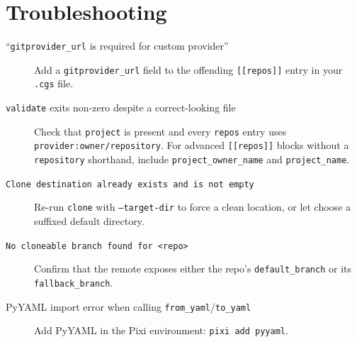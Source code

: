 \section{Troubleshooting}

\begin{description}
  \item[``\texttt{gitprovider\_url} is required for custom provider'']
    Add a \texttt{gitprovider\_url} field to the offending
    \texttt{[[repos]]} entry in your \texttt{.cgs} file.
  \item[\texttt{validate} exits non-zero despite a correct-looking file]
    Check that \texttt{project} is present and every \texttt{repos} entry uses
    \texttt{provider:owner/repository}. For advanced \texttt{[[repos]]}
    blocks without a \texttt{repository} shorthand, include
    \texttt{project\_owner\_name} and \texttt{project\_name}.
  \item[\texttt{Clone destination already exists and is not empty}]
    Re-run \texttt{clone} with \texttt{--target-dir} to force a clean location,
    or let \cgscli{} choose a suffixed default directory.
  \item[\texttt{No cloneable branch found for <repo>}]
    Confirm that the remote exposes either the repo's
    \texttt{default\_branch} or its \texttt{fallback\_branch}.
  \item[PyYAML import error when calling \texttt{from\_yaml}/\texttt{to\_yaml}]
    Add PyYAML in the Pixi environment: \texttt{pixi add pyyaml}.
\end{description}

